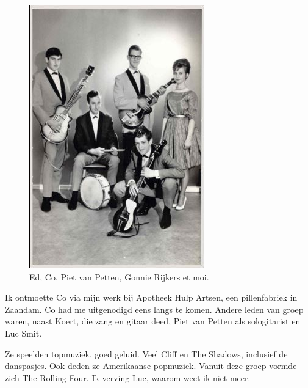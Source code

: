 \documentclass[10pt,twoside, openright]{memoir}
\begin{document}
\begin{figure}
\includegraphics[width=\textwidth]{img/142-RF}
\caption*{\footnotesize Ed, Co, Piet van Petten, Gonnie Rijkers et moi.}
\end{figure}

Ik ontmoette Co via mijn werk bij Apotheek Hulp Artsen, een pillenfabriek in Zaandam. Co had me uitgenodigd eens langs te komen. Andere leden van groep waren, naast Koert, die zang en gitaar deed, Piet van Petten als sologitarist en Luc Smit.  

Ze speelden topmuziek, goed geluid. Veel Cliff en The Shadows, inclusief de danspasjes. Ook deden ze Amerikaanse popmuziek. Vanuit deze groep vormde zich The Rolling Four. Ik verving Luc, waarom weet ik niet meer.
\end{document}

